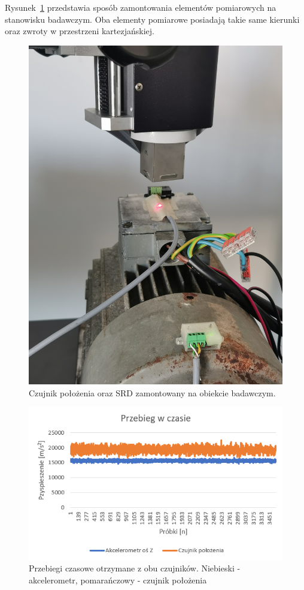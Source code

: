 \documentclass[a4paper, 12pt]{mwart}
\begin{document}
Rysunek~\ref{fig:img20221108124622} przedstawia sposób zamontowania elementów pomiarowych na stanowisku badawczym. Oba elementy pomiarowe posiadają takie same kierunki oraz zwroty w przestrzeni kartezjańskiej.
\begin{figure}[H]
	\centering
	\includegraphics[width=0.6\linewidth]{assets/IMG_20221108_124622}
	\caption{Czujnik położenia oraz SRD zamontowany na obiekcie badawczym.}
	\label{fig:img20221108124622}
\end{figure}
 

\begin{figure}[H]
	\centering
	\includegraphics[width=0.95\linewidth]{assets/timePlot1}
	\caption{Przebiegi czasowe otrzymane z obu czujników. Niebieski - akcelerometr, pomarańczowy - czujnik położenia}
	\label{fig:timeplot1}
\end{figure}
\end{document}
